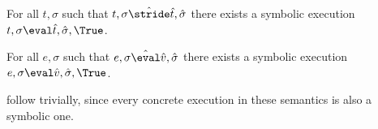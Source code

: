 \begin{lemma}
  \label{lem:completeStride}
  For all $t,\sigma$ such that $t,\sigma \hat{\stride}\hat{t},\hat{\sigma}$
  there exists a symbolic execution $t,\sigma\eval \hat{t},\hat{\sigma},\True$.
\end{lemma}

\begin{lemma}
  \label{lem:completeEval}
  For all $e,\sigma$ such that $e,\sigma \hat{\eval}\hat{v},\hat{\sigma}$
  there exists a symbolic execution $e,\sigma\eval \hat{v},\hat{\sigma},\True$.
\end{lemma}

 follow trivially, since every concrete execution in these semantics is also a symbolic one.
